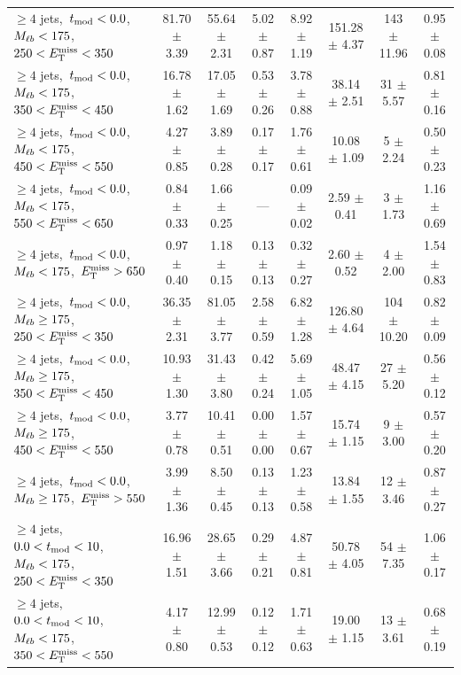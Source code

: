 \begin{table}
\begin{tabular}{|l|c c c c c|c|c|}
\hline
$\ge4$ jets,~$t_\text{mod} <0.0$,~$M_{\ell b}<175$,~$250<E_\text{T}^\text{miss}<350$       & 81.70 $\pm$ 3.39 & 55.64 $\pm$ 2.31  & 5.02 $\pm$ 0.87 & 8.92 $\pm$ 1.19  & 151.28 $\pm$ 4.37 & 143 $\pm$ 11.96 & 0.95 $\pm$ 0.08 \\
$\ge4$ jets,~$t_\text{mod} <0.0$,~$M_{\ell b}<175$,~$350<E_\text{T}^\text{miss}<450$       & 16.78 $\pm$ 1.62 & 17.05 $\pm$ 1.69  & 0.53 $\pm$ 0.26 & 3.78 $\pm$ 0.88  & 38.14 $\pm$ 2.51  & 31 $\pm$ 5.57   & 0.81 $\pm$ 0.16 \\
$\ge4$ jets,~$t_\text{mod} <0.0$,~$M_{\ell b}<175$,~$450<E_\text{T}^\text{miss}<550$       & 4.27 $\pm$ 0.85  & 3.89 $\pm$ 0.28   & 0.17 $\pm$ 0.17 & 1.76 $\pm$ 0.61  & 10.08 $\pm$ 1.09  & 5 $\pm$ 2.24    & 0.50 $\pm$ 0.23 \\
$\ge4$ jets,~$t_\text{mod} <0.0$,~$M_{\ell b}<175$,~$550<E_\text{T}^\text{miss}<650$       & 0.84 $\pm$ 0.33  & 1.66 $\pm$ 0.25   &       ---       & 0.09 $\pm$ 0.02  & 2.59 $\pm$ 0.41   & 3 $\pm$ 1.73    & 1.16 $\pm$ 0.69 \\
$\ge4$ jets,~$t_\text{mod} <0.0$,~$M_{\ell b}<175$,~$E_\text{T}^\text{miss}>650$           & 0.97 $\pm$ 0.40  & 1.18 $\pm$ 0.15   & 0.13 $\pm$ 0.13 & 0.32 $\pm$ 0.27  & 2.60 $\pm$ 0.52   & 4 $\pm$ 2.00    & 1.54 $\pm$ 0.83 \\
\hline
$\ge4$ jets,~$t_\text{mod} <0.0$,~$M_{\ell b}\ge175$,~$250<E_\text{T}^\text{miss}<350$     & 36.35 $\pm$ 2.31 & 81.05 $\pm$ 3.77  & 2.58 $\pm$ 0.59 & 6.82 $\pm$ 1.28  & 126.80 $\pm$ 4.64 & 104 $\pm$ 10.20 & 0.82 $\pm$ 0.09 \\
$\ge4$ jets,~$t_\text{mod} <0.0$,~$M_{\ell b}\ge175$,~$350<E_\text{T}^\text{miss}<450$     & 10.93 $\pm$ 1.30 & 31.43 $\pm$ 3.80  & 0.42 $\pm$ 0.24 & 5.69 $\pm$ 1.05  & 48.47 $\pm$ 4.15  & 27 $\pm$ 5.20   & 0.56 $\pm$ 0.12 \\
$\ge4$ jets,~$t_\text{mod} <0.0$,~$M_{\ell b}\ge175$,~$450<E_\text{T}^\text{miss}<550$     & 3.77 $\pm$ 0.78  & 10.41 $\pm$ 0.51  & 0.00 $\pm$ 0.00 & 1.57 $\pm$ 0.67  & 15.74 $\pm$ 1.15  & 9 $\pm$ 3.00    & 0.57 $\pm$ 0.20 \\
$\ge4$ jets,~$t_\text{mod} <0.0$,~$M_{\ell b}\ge175$,~$E_\text{T}^\text{miss}>550$         & 3.99 $\pm$ 1.36  & 8.50 $\pm$ 0.45   & 0.13 $\pm$ 0.13 & 1.23 $\pm$ 0.58  & 13.84 $\pm$ 1.55  & 12 $\pm$ 3.46   & 0.87 $\pm$ 0.27 \\
\hline
$\ge4$ jets,~$0.0< t_\text{mod} <10$,~$M_{\ell b}<175$,~$250<E_\text{T}^\text{miss}<350$  & 16.96 $\pm$ 1.51 & 28.65 $\pm$ 3.66  & 0.29 $\pm$ 0.21 & 4.87 $\pm$ 0.81  & 50.78 $\pm$ 4.05  & 54 $\pm$ 7.35   & 1.06 $\pm$ 0.17 \\
$\ge4$ jets,~$0.0< t_\text{mod} <10$,~$M_{\ell b}<175$,~$350<E_\text{T}^\text{miss}<550$  & 4.17 $\pm$ 0.80  & 12.99 $\pm$ 0.53  & 0.12 $\pm$ 0.12 & 1.71 $\pm$ 0.63  & 19.00 $\pm$ 1.15  & 13 $\pm$ 3.61   & 0.68 $\pm$ 0.19 \\

\end{tabular}
\end{table}
